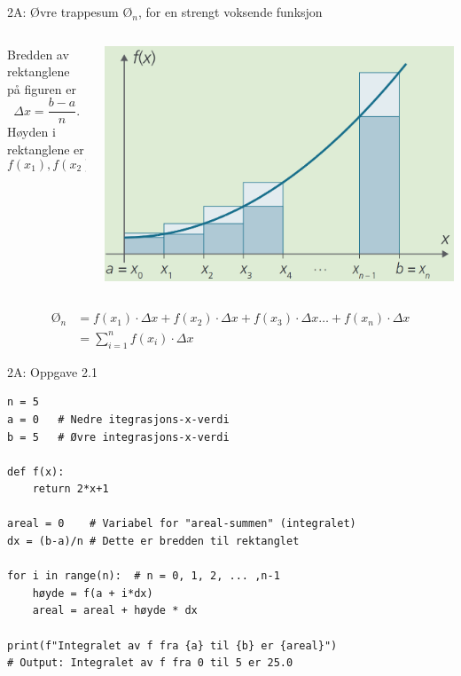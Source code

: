 \greenheader
\begin{frame}{2A: Øvre trappesum $\text{Ø}_n$,  for en strengt voksende funksjon}
    \begin{columns} 
        \begin{column}{0.40\textwidth}
            Bredden av rektanglene på figuren er 
            \[
                \Delta x = \frac{b-a}{n}.
            \]
            Høyden i rektanglene er 
            \[
                f(x_1), f(x_2), f(x_3), \dots, f(x_{n}).
            \]
           
            
        \end{column}
        \begin{column}{0.60\textwidth}
            \centering
            \includegraphics[width=1\linewidth]{R2-K2A-15.png}
        \end{column}
    \end{columns}
    \begin{align*}
                 \text{Ø}_n &=  
                 f(x_1)\cdot \Delta x + f(x_2)\cdot \Delta x + f(x_3)\cdot \Delta x \dots + f(x_{n})\cdot \Delta x\\
                &=  \sum_{i=1}^{n} f(x_{i})\cdot \Delta x
            \end{align*}
\end{frame}

\greenheader
\begin{frame}[fragile]{2A: Oppgave 2.1}
\begin{verbatim}
n = 5 
a = 0   # Nedre itegrasjons-x-verdi
b = 5   # Øvre integrasjons-x-verdi

def f(x):
    return 2*x+1

areal = 0    # Variabel for "areal-summen" (integralet)
dx = (b-a)/n # Dette er bredden til rektanglet

for i in range(n):  # n = 0, 1, 2, ... ,n-1
    høyde = f(a + i*dx)
    areal = areal + høyde * dx

print(f"Integralet av f fra {a} til {b} er {areal}")
# Output: Integralet av f fra 0 til 5 er 25.0
\end{verbatim}
\end{frame}

